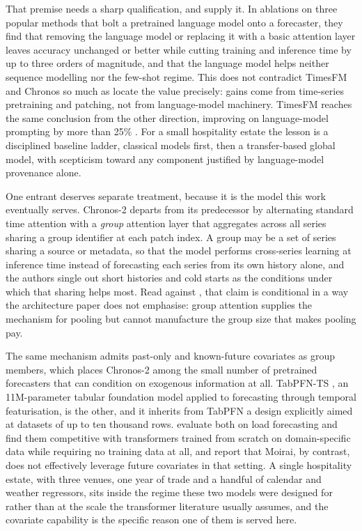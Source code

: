 That premise needs a sharp qualification, and \citet{tan_are_2024} supply it.
In ablations on three popular methods that bolt a pretrained language model
onto a forecaster, they find that removing the language model or replacing it
with a basic attention layer leaves accuracy unchanged or better while cutting
training and inference time by up to three orders of magnitude, and that the
language model helps neither sequence modelling nor the few-shot regime. This
does not contradict TimesFM and Chronos so much as locate the value precisely:
gains come from time-series pretraining and patching, not from language-model
machinery. TimesFM reaches the same conclusion from the other direction,
improving on language-model prompting by more than 25\%
\citep{das_decoder-only_2024}. For a small hospitality estate the lesson is a
disciplined baseline ladder, classical models first, then a transfer-based
global model, with scepticism toward any component justified by language-model
provenance alone.

One entrant deserves separate treatment, because it is the model this work
eventually serves. Chronos-2 \citep{ansari_chronos-2_2025} departs from its
predecessor by alternating standard time attention with a \emph{group}
attention layer that aggregates across all series sharing a group identifier at
each patch index. A group may be a set of series sharing a source or metadata,
so that the model performs cross-series learning at inference time instead of
forecasting each series from its own history alone, and the authors single out
short histories and cold starts as the conditions under which that sharing
helps most. Read against \citet{montero-manso_principles_2021}, that claim is
conditional in a way the architecture paper does not emphasise: group attention
supplies the mechanism for pooling but cannot manufacture the group size that
makes pooling pay.

The same mechanism admits past-only and known-future covariates as group
members, which places Chronos-2 among the small number of pretrained
forecasters that can condition on exogenous information at all. TabPFN-TS
\citep{hoo_tables_2026}, an 11M-parameter tabular foundation model applied to
forecasting through temporal featurisation, is the other, and it inherits from
TabPFN \citep{hollmann_accurate_2025} a design explicitly aimed at datasets of
up to ten thousand rows. \citet{hertel_explainable_2026} evaluate both on load
forecasting and find them competitive with transformers trained from scratch on
domain-specific data while requiring no training data at all, and report that
Moirai, by contrast, does not effectively leverage future covariates in that
setting. A single hospitality estate, with three venues, one year of trade and
a handful of calendar and weather regressors, sits inside the regime these two
models were designed for rather than at the scale the transformer literature
usually assumes, and the covariate capability is the specific reason one of
them is served here.

